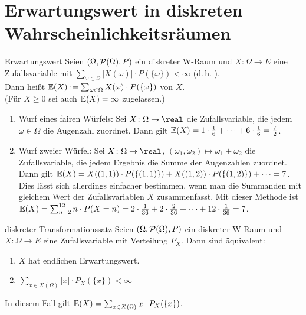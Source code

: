 \pagebreak

\section{%
    Erwartungswert in diskreten Wahrscheinlichkeitsräumen%
}

\begin{Def}{Erwartungswert}
    Seien $(\Omega, \P(\Omega), P)$ ein diskreter W-Raum und
    $X\colon \Omega \rightarrow E$ eine Zufallsvariable mit
    $\sum_{\omega \in \Omega} |X(\omega)| \cdot P(\{\omega\}) < \infty$
    (d.\,h. ).\\
    Dann heißt $\EW(X) := \sum_{\omega \in \Omega} X(\omega) \cdot P(\{\omega\})$
     von $X$.\\
    (Für $X \ge 0$ sei auch $\EW(X) = \infty$ zugelassen.)
\end{Def}

\begin{Bsp}
    \begin{enumerate}
        \item
        Wurf eines fairen Würfels:
        Sei $X\colon \Omega \rightarrow \real$ die Zufallsvariable, die jedem $\omega \in \Omega$
        die Augenzahl zuordnet.
        Dann gilt $\EW(X) = 1 \cdot \frac{1}{6} + \dotsb + 6 \cdot \frac{1}{6} = \frac{7}{2}$.

        \item
        Wurf zweier Würfel:
        Sei $X\colon \Omega \rightarrow \real$,
        $(\omega_1, \omega_2) \mapsto \omega_1 + \omega_2$ die Zufallsvariable, die jedem Ergebnis
        die Summe der Augenzahlen zuordnet.\\
        Dann gilt $\EW(X) = X((1, 1)) \cdot P(\{(1, 1)\}) +
        X((1, 2)) \cdot P(\{(1, 2)\}) + \dotsb = 7$.\\
        Dies lässt sich allerdings einfacher bestimmen, wenn man die Summanden mit gleichem
        Wert der Zufallsvariablen $X$ zusammenfasst.
        Mit dieser Methode ist\\
        $\EW(X) = \sum_{n=2}^{12} n \cdot P(X = n) =
        2 \cdot \frac{1}{36} + 2 \cdot \frac{2}{36} + \dotsb + 12 \cdot \frac{1}{36} = 7$.
    \end{enumerate}
\end{Bsp}

\begin{Satz}{diskreter Transformationssatz}
    Seien $(\Omega, \P(\Omega), P)$ ein diskreter W-Raum und
    $X\colon \Omega \rightarrow E$ eine Zufallsvariable mit Verteilung $P_X$.
    Dann sind äquivalent:
    \begin{enumerate}
        \item
        $X$ hat endlichen Erwartungswert.

        \item
        $\sum_{x \in X(\Omega)} |x| \cdot P_X(\{x\}) < \infty$
    \end{enumerate}
    In diesem Fall gilt $\EW(X) = \sum_{x \in X(\Omega)} x \cdot P_X(\{x\})$.
\end{Satz}

